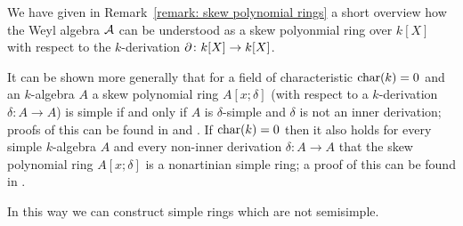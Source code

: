 \begin{remark}
  We have given in Remark~\ref{remark: skew polynomial rings} a short overview how the Weyl algebra $\operatorname{\mathcal{A}}$ can be understood as a skew polyonmial ring over $k[X]$ with respect to the $k$-derivation $\partial \colon k[X] \to k[X]$.
  
  It can be shown more generally that for a field of characteristic $\operatorname{char}(k) = 0$ and an $k$-algebra $A$ a skew polynomial ring $A[x;\delta]$ (with respect to a $k$-derivation $\delta \colon A \to A$) is simple if and only if $A$ is $\delta$-simple and $\delta$ is not an inner derivation;
  proofs of this can be found in \cite[Theorem~3.15]{Lam1991First} and \cite[Proposition~2.1]{NoncommutativeNoetherian}.
  If $\operatorname{char}(k) = 0$ then it also holds for every simple $k$-algebra $A$ and every non-inner derivation $\delta \colon A \to A$ that the skew polynomial ring $A[x;\delta]$ is a nonartinian simple ring; a proof of this can be found in \cite[Corollary~3.16]{Lam1991First}.
  
  In this way we can construct simple rings which are not semisimple.
\end{remark}


